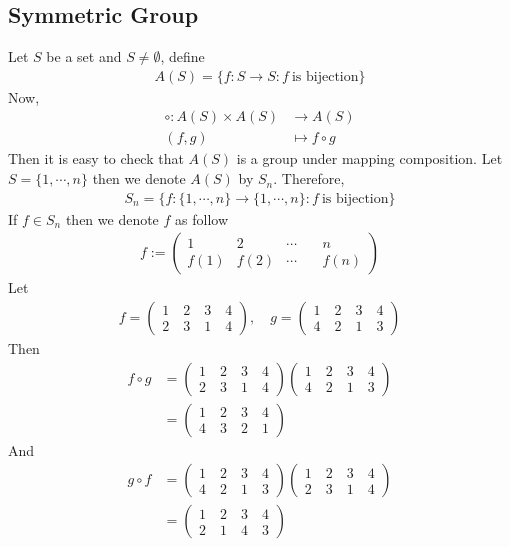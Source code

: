 \documentclass[11pt]{amsart}
\begin{document}
\subsection{Symmetric Group}
Let $S$ be a set and $S\neq \emptyset$, define \begin{align*}
A(S)=\{f:S\to S:f~\text{is bijection}\}
\end{align*}
Now, \begin{align*}
\circ: A(S)\times A(S)&\to A(S)\\
(f,g)&\mapsto f\circ g
\end{align*}
Then it is easy to check that $A(S)$ is a group under mapping composition. Let $S=\{1,\cdots,n\}$ then we denote  $A(S)$ by $S_n.$ Therefore, \begin{align*}
S_n=\{f:\{1,\cdots,n\}\to \{1,\cdots,n\}:f~\text{is bijection}\}
\end{align*}
If $f\in S_n$ then we denote $f$ as follow \begin{align*}
f:=\begin{pmatrix}
1\quad&2\quad&\cdots \quad&n\\
f(1)&f(2)&\cdots &f(n)
\end{pmatrix}
\end{align*}
Let \begin{align*}
f=\begin{pmatrix}
1\quad2\quad3\quad4\\
2\quad3\quad1\quad4
\end{pmatrix},\quad g=\begin{pmatrix}
1\quad2\quad3\quad4\\
4\quad2\quad1\quad3
\end{pmatrix}
\end{align*}
Then \begin{align*}
f\circ g&=\begin{pmatrix}
1\quad2\quad3\quad4\\
2\quad3\quad1\quad4
\end{pmatrix}\begin{pmatrix}
1\quad2\quad3\quad4\\
4\quad2\quad1\quad3
\end{pmatrix}\\
&=\begin{pmatrix}
1\quad2\quad3\quad4\\
4\quad3\quad2\quad1
\end{pmatrix}
\end{align*}
And \begin{align*}
g\circ f&=\begin{pmatrix}
1\quad2\quad3\quad4\\
4\quad2\quad1\quad3
\end{pmatrix}\begin{pmatrix}
1\quad2\quad3\quad4\\
2\quad3\quad1\quad4
\end{pmatrix}\\
&=\begin{pmatrix}
1\quad2\quad3\quad4\\
2\quad1\quad4\quad3
\end{pmatrix}
\end{align*}
\end{document}
